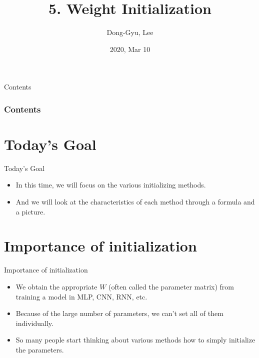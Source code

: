 \documentclass{beamer}
\title[Short title]{5. Weight Initialization}
\author{Dong-Gyu, Lee}
\institute[] %
{
	Dept. of Statistics, KU%
	\medskip
}
\date{2020, Mar 10} %
\begin{document}
	
	\begin{frame}
		\titlepage %
	\end{frame}
	
	\begin{frame}{Contents}
	\frametitle{Contents}
		\tableofcontents 
	\end{frame}
	
	\section{Today's Goal}
	\begin{frame}{Today's Goal}
		\begin{itemize}
			\item In this time, we will focus on the various initializing methods.
			\item And we will look at the characteristics of each method through a formula and a picture.
		\end{itemize}
	\end{frame}


	\section{Importance of initialization}
	\begin{frame}{Importance of initialization}
		\begin{itemize}
			\item We obtain the appropriate $W$ (often called the parameter matrix) from training a model in MLP, CNN, RNN, etc.
			\item Because of the large number of parameters, we can't set all of them individually.
			\item So many people start thinking about various methods how to simply initialize the parameters.
		\end{itemize}
	\end{frame}	
		
\end{document}
